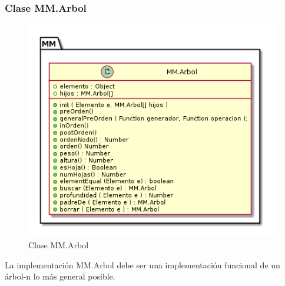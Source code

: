 \subsubsection{Clase MM.Arbol}

\begin{figure}[tbph]
\centering
\includegraphics[width=0.7\linewidth]{imagenes/diagrama-clase-mm-arbol}
\caption{Clase MM.Arbol}
\label{fig:diagrama-clase-mm-arbol}
\end{figure}

La implementación MM.Arbol debe ser una implementación funcional de un árbol-n lo más general posible. 

